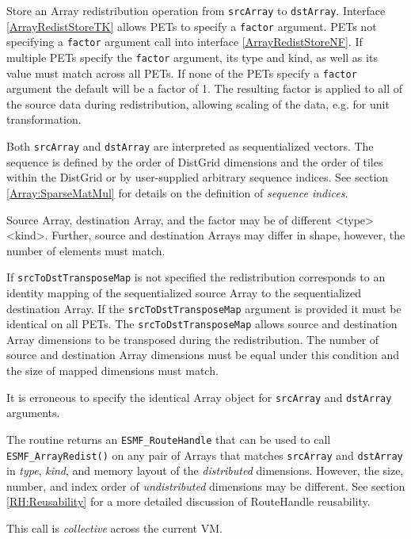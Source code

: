    Store an Array redistribution operation from {\tt srcArray} to {\tt dstArray}.
   Interface \ref{ArrayRedistStoreTK} allows PETs to specify a {\tt factor}
   argument. PETs not specifying a {\tt factor} argument call into interface
   \ref{ArrayRedistStoreNF}. If multiple PETs specify the {\tt factor} argument,
   its type and kind, as well as its value must match across all PETs. If none
   of the PETs specify a {\tt factor} argument the default will be a factor of
   1. The resulting factor is applied to all of the source data during
   redistribution, allowing scaling of the data, e.g. for unit transformation.
    
   Both {\tt srcArray} and {\tt dstArray} are interpreted as sequentialized 
   vectors. The sequence is defined by the order of DistGrid dimensions and the
   order of tiles within the DistGrid or by user-supplied arbitrary sequence
   indices. See section \ref{Array:SparseMatMul} for details on the definition
   of {\em sequence indices}.
  
   Source Array, destination Array, and the factor may be of different
   <type><kind>. Further, source and destination Arrays may differ in shape,
   however, the number of elements must match. 
    
   If {\tt srcToDstTransposeMap} is not specified the redistribution corresponds
   to an identity mapping of the sequentialized source Array to the
   sequentialized destination Array. If the {\tt srcToDstTransposeMap}
   argument is provided it must be identical on all PETs. The
   {\tt srcToDstTransposeMap} allows source and destination Array dimensions to
   be transposed during the redistribution. The number of source and destination
   Array dimensions must be equal under this condition and the size of mapped
   dimensions must match.
    
   It is erroneous to specify the identical Array object for {\tt srcArray} and
   {\tt dstArray} arguments. 
  
     The routine returns an {\tt ESMF\_RouteHandle} that can be used to call 
     {\tt ESMF\_ArrayRedist()} on any pair of Arrays that matches 
     {\tt srcArray} and {\tt dstArray} in {\em type}, {\em kind}, and 
     memory layout of the {\em distributed} dimensions. However, the size,
     number, and index order of {\em undistributed} dimensions may be different.
     See section \ref{RH:Reusability} for a more detailed discussion of
     RouteHandle reusability.
  
   This call is {\em collective} across the current VM.  
  
